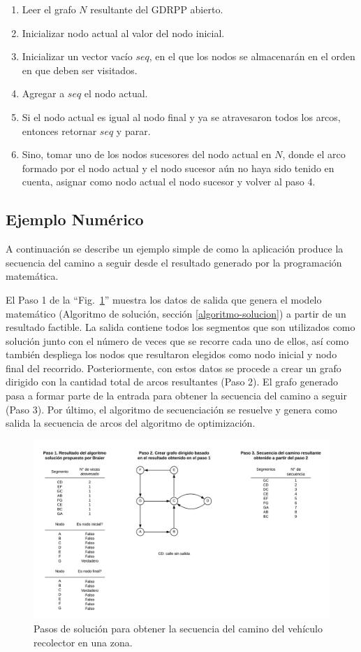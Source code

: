 \documentclass[spanish, conference]{IEEEtran}
\begin{document}
\begin{enumerate}
\item Leer el grafo $N$ resultante del GDRPP abierto. 
\item Inicializar nodo actual al valor del nodo inicial.
\item Inicializar un vector vacío $seq$, en el que los nodos se almacenarán en el orden en que deben ser visitados.
\item Agregar a $seq$ el nodo actual.
\item Si el nodo actual es igual al nodo final y ya se atravesaron todos los arcos, entonces retornar $seq$ y parar.
\item Sino, tomar uno de los nodos sucesores del nodo actual en $N$, donde el arco formado por el nodo actual y el nodo sucesor aún no haya sido tenido en cuenta, asignar como nodo actual el nodo sucesor y volver al paso 4.
\end{enumerate}

\subsection{Ejemplo Numérico}
A continuación se describe un ejemplo simple de como la aplicación produce la secuencia del camino a seguir desde el resultado generado por la programación matemática.

El Paso 1 de la ``Fig.~\ref{fig:PasosSolucion}'' muestra los datos de salida que genera el modelo matemático (Algoritmo  de  solución, sección \ref{algoritmo-solucion}) a partir de un resultado factible. La salida contiene todos los segmentos que son utilizados como solución junto con el número de veces que se recorre cada uno de ellos, así como también despliega los nodos que resultaron elegidos como nodo inicial y nodo final del recorrido. Posteriormente, con estos datos se procede a crear un grafo dirigido con la cantidad total de arcos resultantes (Paso 2). El grafo generado pasa a formar parte de la entrada para obtener la secuencia del camino a seguir (Paso 3). Por último, el algoritmo de secuenciación se resuelve y genera como salida la secuencia de arcos del algoritmo de optimización.

\begin{figure}[htbp]
\centerline{\includegraphics[width=\textwidth]{imagenes/pasos_de_solucion.png}}
\caption{Pasos de solución para obtener la secuencia del camino del vehículo recolector en una zona.}
\label{fig:PasosSolucion}
\end{figure}
\end{document}
